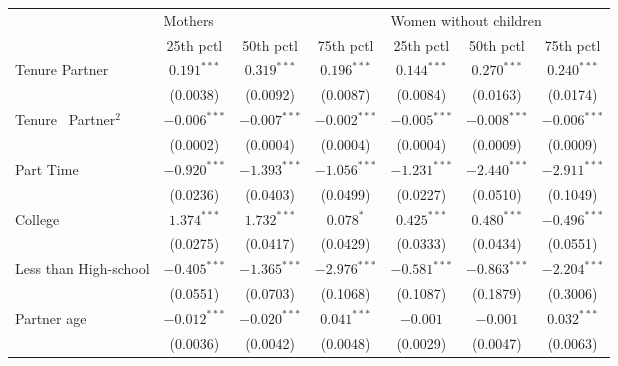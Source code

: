 \begin{tabular}{l|ccc|ccc}
\toprule
{} & \multicolumn{3}{l}{Mothers} & \multicolumn{3}{l}{Women without children} \\
{} &       25th pctl &       50th pctl &       75th pctl &              25th pctl &       50th pctl &       75th pctl \\
\midrule
Tenure Partner                &   $0.191^{***}$ &   $0.319^{***}$ &   $0.196^{***}$ &          $0.144^{***}$ &   $0.270^{***}$ &   $0.240^{***}$ \\
                              &        (0.0038) &        (0.0092) &        (0.0087) &               (0.0084) &        (0.0163) &        (0.0174) \\
Tenure \ Partner$^{2}$        &  $-0.006^{***}$ &  $-0.007^{***}$ &  $-0.002^{***}$ &         $-0.005^{***}$ &  $-0.008^{***}$ &  $-0.006^{***}$ \\
                              &        (0.0002) &        (0.0004) &        (0.0004) &               (0.0004) &        (0.0009) &        (0.0009) \\
Part Time                     &  $-0.920^{***}$ &  $-1.393^{***}$ &  $-1.056^{***}$ &         $-1.231^{***}$ &  $-2.440^{***}$ &  $-2.911^{***}$ \\
                              &        (0.0236) &        (0.0403) &        (0.0499) &               (0.0227) &        (0.0510) &        (0.1049) \\
College                       &   $1.374^{***}$ &   $1.732^{***}$ &       $0.078^*$ &          $0.425^{***}$ &   $0.480^{***}$ &  $-0.496^{***}$ \\
                              &        (0.0275) &        (0.0417) &        (0.0429) &               (0.0333) &        (0.0434) &        (0.0551) \\
Less than High-school         &  $-0.405^{***}$ &  $-1.365^{***}$ &  $-2.976^{***}$ &         $-0.581^{***}$ &  $-0.863^{***}$ &  $-2.204^{***}$ \\
                              &        (0.0551) &        (0.0703) &        (0.1068) &               (0.1087) &        (0.1879) &        (0.3006) \\
Partner age                   &  $-0.012^{***}$ &  $-0.020^{***}$ &   $0.041^{***}$ &               $-0.001$ &        $-0.001$ &   $0.032^{***}$ \\
                              &        (0.0036) &        (0.0042) &        (0.0048) &               (0.0029) &        (0.0047) &        (0.0063) \\

\end{tabular}
